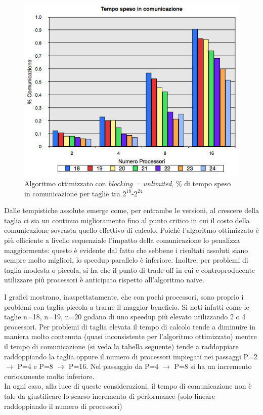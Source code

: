 \documentclass[12pt,a4paper,oneside,openright]{article}
\begin{document}
\begin{figure}[H] 
  \centering
      \includegraphics[height=0.4\textheight]{immagini/comunicazione_ottimizzata_senza_rete}
 	  \caption{\textsf{Algoritmo ottimizzato} con \emph{blocking = unlimited}, \% di tempo speso in comunicazione per taglie tra $2^{18}$-$2^{24}$}
\end{figure}

Dalle tempistiche assolute emerge come, per entrambe le versioni, al crescere della taglia ci sia un continuo miglioramento fino al punto critico in cui il costo della comunicazione sovrasta quello effettivo di calcolo. Poichè l'algoritmo ottimizzato è più efficiente a livello sequenziale l'impatto della comunicazione lo penalizza maggiormente: questo è evidente dal fatto che sebbene i risultati assoluti siano sempre molto migliori, lo speedup parallelo è inferiore. Inoltre, per problemi di taglia modesta o piccola, si ha che il punto di trade-off in cui è controproducente utilizzare più processori è anticipato rispetto all'algoritmo naive. 

I grafici mostrano, inaspettatamente, che con pochi processori, sono proprio i problemi con taglia piccola a trarne il maggior beneficio. Si noti infatti come le taglie n=18, n=19, n=20 godano di uno speedup più elevato utilizzando 2 o 4 processori. Per problemi di taglia elevata  il tempo di calcolo tende a diminuire in maniera molto contenuta (quasi inconsistente per l'algoritmo ottimizzato) mentre il tempo di comunicazione (si veda la tabella seguente) tende a raddoppiare raddoppiando la taglia oppure il numero di processori impiegati nei passaggi P=2 $\rightarrow$ P=4 e P=8 $\rightarrow$ P=16. Nel passaggio da P=4 $\rightarrow$ P=8 si ha un incremento curiosamente molto inferiore.\\ In ogni caso, alla luce di queste considerazioni, il tempo di comunicazione non è tale da giustificare lo scarso incremento di performance (solo lineare raddoppiando il numero di processori)
\end{document}
